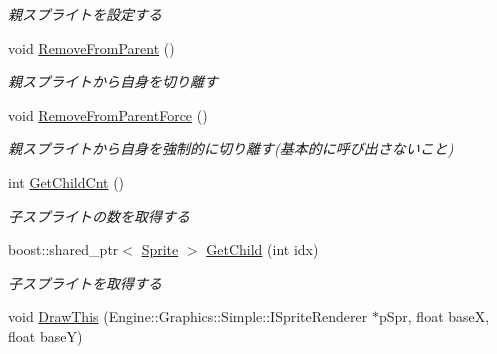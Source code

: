 \begin{DoxyCompactItemize}
\begin{DoxyCompactList}\small\item\em 親スプライトを設定する \end{DoxyCompactList}\item 
void \hyperlink{class_sprite_a5cff0acb60cc920ba029370cf51189d6}{Remove\+From\+Parent} ()\hypertarget{class_sprite_a5cff0acb60cc920ba029370cf51189d6}{}\label{class_sprite_a5cff0acb60cc920ba029370cf51189d6}

\begin{DoxyCompactList}\small\item\em 親スプライトから自身を切り離す \end{DoxyCompactList}\item 
void \hyperlink{class_sprite_a4ac35f129e53066caed4095346436988}{Remove\+From\+Parent\+Force} ()\hypertarget{class_sprite_a4ac35f129e53066caed4095346436988}{}\label{class_sprite_a4ac35f129e53066caed4095346436988}

\begin{DoxyCompactList}\small\item\em 親スプライトから自身を強制的に切り離す(基本的に呼び出さないこと) \end{DoxyCompactList}\item 
int \hyperlink{class_sprite_ab3c4588051c85b918427f2fc7418bc02}{Get\+Child\+Cnt} ()\hypertarget{class_sprite_ab3c4588051c85b918427f2fc7418bc02}{}\label{class_sprite_ab3c4588051c85b918427f2fc7418bc02}

\begin{DoxyCompactList}\small\item\em 子スプライトの数を取得する \end{DoxyCompactList}\item 
boost\+::shared\+\_\+ptr$<$ \hyperlink{class_sprite}{Sprite} $>$ \hyperlink{class_sprite_a6a749d3a10f96778d41c215fbc44febc}{Get\+Child} (int idx)\hypertarget{class_sprite_a6a749d3a10f96778d41c215fbc44febc}{}\label{class_sprite_a6a749d3a10f96778d41c215fbc44febc}

\begin{DoxyCompactList}\small\item\em 子スプライトを取得する \end{DoxyCompactList}\item 
void \hyperlink{class_sprite_a876a63cc6e81caf295fbeb45563b2de6}{Draw\+This} (Engine\+::\+Graphics\+::\+Simple\+::\+I\+Sprite\+Renderer $\ast$p\+Spr, float baseX, float baseY)\hypertarget{class_sprite_a876a63cc6e81caf295fbeb45563b2de6}{}\label{class_sprite_a876a63cc6e81caf295fbeb45563b2de6}


\end{DoxyCompactItemize}
